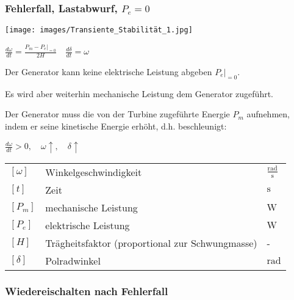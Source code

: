 \subsubsection{Fehlerfall, Lastabwurf, $P_e = 0$}

\texttt{[image: images/Transiente\_Stabilität\_1.jpg]}

\vspace{0.15cm}

$
\boxed{
\frac{d\omega}{dt} = \frac{P_m - P_{e}\big|_{=0}}{2H}
}
\quad
\boxed{
\frac{d\delta}{dt} = \omega
}
$

\vspace{0.15cm}

Der Generator kann keine elektrische Leistung abgeben $P_{e}\big|_{=0}$.

Es wird aber weiterhin mechanische Leistung dem Generator zugeführt.

Der Generator muss die von der Turbine zugeführte Energie $P_m$ aufnehmen, indem er seine kinetische Energie erhöht, d.h. beschleunigt:

\vspace{0.15cm}

$
\frac{d\omega}{dt} > 0,\quad \omega \uparrow,\quad \delta \uparrow
$

\vspace{0.15cm}

\renewcommand{\arraystretch}{1.2}
\begin{tabular}{@{} l p{6cm} l @{}}
    $[\omega]$     & Winkelgeschwindigkeit \dotfill              & $\frac{\text{rad}}{\text{s}}$ \\
    $[t]$          & Zeit \dotfill                               & $\text{s}$ \\
    $[P_m]$        & mechanische Leistung \dotfill               & $\text{W}$ \\
    $[P_e]$        & elektrische Leistung \dotfill               & $\text{W}$ \\
    $[H]$          & Trägheitsfaktor (proportional zur Schwungmasse) \dotfill & - \\
    $[\delta]$     & Polradwinkel \dotfill                        & $\text{rad}$ \\
\end{tabular}

\subsubsection{Wiedereischalten nach Fehlerfall}

